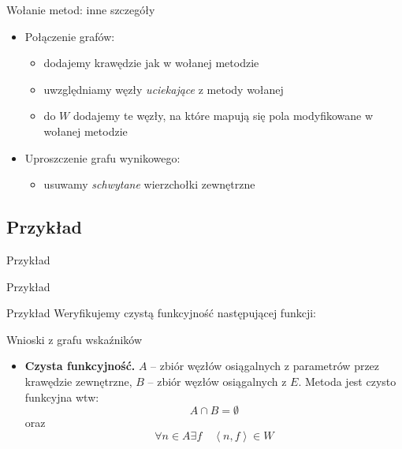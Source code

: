 \documentclass{beamer}
\begin{document}
\begin{frame}{Wołanie metod: inne szczegóły}
  \begin{itemize}
  \item<1-> Połączenie grafów:
    \begin{itemize}
    \item dodajemy krawędzie jak w wołanej metodzie
    \item uwzględniamy węzły \emph{uciekające} z metody wołanej
    \item do $W$ dodajemy te węzły, na które mapują się pola
      modyfikowane w wołanej metodzie
    \end{itemize}
  \item<2-> Uproszczenie grafu wynikowego:
    \begin{itemize}
    \item usuwamy \emph{schwytane} wierzchołki zewnętrzne
    \end{itemize}
  \end{itemize}
\end{frame}

\subsection{Przykład}

\begin{frame}{Przykład}
  \small{
    
  }
\end{frame}

\begin{frame}{Przykład}
  \small{
    
  }
\end{frame}

\begin{frame}{Przykład}
  Weryfikujemy czystą funkcyjność następującej funkcji: 
  
\end{frame}

\begin{frame}{Wnioski z grafu wskaźników}
  \begin{itemize}
    \item \textbf{Czysta funkcyjność.}
      $A$ -- zbiór węzłów osiągalnych z parametrów przez krawędzie zewnętrzne, 
      $B$ -- zbiór węzłów osiągalnych z $E$. 
      Metoda jest czysto funkcyjna wtw:
      $$A \cap B = \emptyset$$
      oraz 
      $$\forall n \in A \exists f \quad \left<n,f\right>\in W$$
  \end{itemize}
\end{frame}
\end{document}
